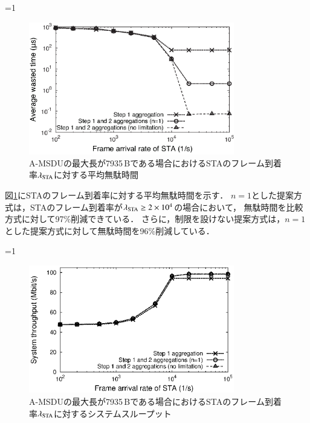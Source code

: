 \documentclass[master]{kuisthesis}		%
\newcounter{flagFig}
\begin{document}
			\par
			\ifnum\value{flagFig}=1 {\begin{figure}[t]
				\begin{center}
					\includegraphics[width=0.8\textwidth]{graph/wst_lmd.eps}
					\caption{A-MSDUの最大長が7935\,Bである場合におけるSTAのフレーム到着率$\lambda_{\rm STA}$に対する平均無駄時間}
					\label{fig:wst_lmd}
				\end{center}
			\end{figure}}\fi
			図\ref{fig:wst_lmd}にSTAのフレーム到着率に対する平均無駄時間を示す．
			$n=1$とした提案方式は，STAのフレーム到着率が$\lambda_{\rm STA}\geq 2 \times 10^{4}$の場合において，
			無駄時間を比較方式に対して97\%削減できている．
			さらに，制限を設けない提案方式は，$n=1$とした提案方式に対して無駄時間を96\%削減している．
			\par
			\ifnum\value{flagFig}=1 {\begin{figure}[t]
				\begin{center}
					\includegraphics[width=0.8\textwidth]{graph/thr_lmd.eps}
					\caption{A-MSDUの最大長が7935\,Bである場合におけるSTAのフレーム到着率$\lambda_{\rm STA}$に対するシステムスループット}
					\label{fig:thr_lmd}
				\end{center}
			\end{figure}}\fi
\end{document}
